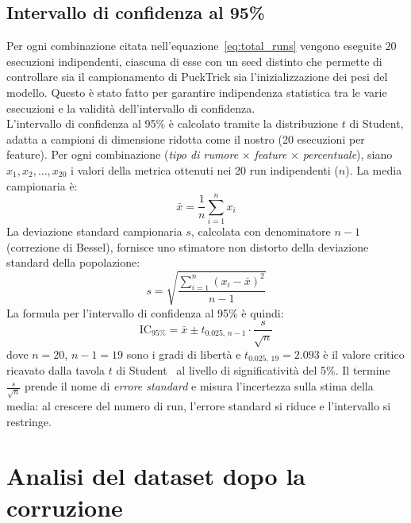 \documentclass[../main.tex]{subfiles}
\begin{document}
\subsection{Intervallo di confidenza al 95\%}
Per ogni combinazione citata nell'equazione~\ref{eq:total_runs} vengono eseguite $20$ esecuzioni indipendenti, ciascuna di esse con un seed distinto che permette di controllare sia il campionamento di PuckTrick sia l'inizializzazione dei pesi del modello.
Questo è stato fatto per garantire indipendenza statistica tra le varie esecuzioni e la validità dell'intervallo di confidenza.\\

L'intervallo di confidenza al 95\% è calcolato tramite la distribuzione
$t$ di Student, adatta a campioni di dimensione ridotta come il nostro (20 esecuzioni per feature).
Per ogni combinazione (\textit{tipo di rumore} $\times$ \textit{feature}
$\times$ \textit{percentuale}), siano $x_1, x_2, \ldots, x_{20}$ i valori
della metrica ottenuti nei 20 run indipendenti ($n$). La media campionaria è:
\begin{equation}
  \bar{x} = \frac{1}{n} \sum_{i=1}^{n} x_i
  \label{eq:mean}
\end{equation}
La deviazione standard campionaria $s$, calcolata con denominatore $n-1$ (correzione di Bessel), fornisce uno stimatore non distorto della deviazione standard della popolazione:
\begin{equation}
  s = \sqrt{\frac{\sum_{i=1}^{n}(x_i - \bar{x})^2}{n-1}}
  \label{eq:std}
\end{equation}
La formula per l'intervallo di confidenza al 95\% è quindi:
\begin{equation}
  \mathrm{IC}_{95\%} = \bar{x} \pm t_{0.025,\, n-1} \cdot \frac{s}{\sqrt{n}}
  \label{eq:CI}
\end{equation}
dove $n = 20$, $n - 1 = 19$ sono i gradi di libertà e $t_{0.025,\,19} = 2.093$ è il valore critico ricavato dalla tavola $t$ di Student~\cite{student_table} al livello di significatività del 5\%. Il termine $\frac{s}{\sqrt{n}}$ prende il nome di \textit{errore standard} e misura l'incertezza sulla stima della media: al crescere del numero di run, l'errore standard si riduce e l'intervallo si restringe.


\section{Analisi del dataset dopo la corruzione}
\label{sec:dataset_corrotto}
\end{document}

